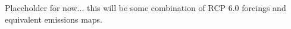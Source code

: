 Placeholder for now... this will be some combination of RCP 6.0 forcings and equivalent emissions maps.\label{fig:eqems}
